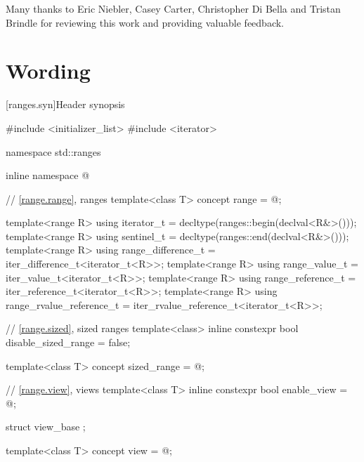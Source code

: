 \documentclass{wg21}
\begin{document}
Many thanks to Eric Niebler, Casey Carter, Christopher Di Bella and Tristan Brindle for
reviewing this work and providing valuable feedback.

\section{Wording}


[ranges.syn]{Header  synopsis}

%
\begin{codeblock}
#include <initializer_list>
#include <iterator>

namespace std::ranges {
	inline namespace @

	// \ref{range.range}, ranges
	template<class T>
	concept range = @\seebelow@;

	template<range R>
	using iterator_t = decltype(ranges::begin(declval<R&>()));
	template<range R>
	using sentinel_t = decltype(ranges::end(declval<R&>()));
	template<range R>
	using range_difference_t = iter_difference_t<iterator_t<R>>;
	template<range R>
	using range_value_t = iter_value_t<iterator_t<R>>;
	template<range R>
	using range_reference_t = iter_reference_t<iterator_t<R>>;
	template<range R>
	using range_rvalue_reference_t = iter_rvalue_reference_t<iterator_t<R>>;

	// \ref{range.sized}, sized ranges
	template<class>
	inline constexpr bool disable_sized_range = false;

	template<class T>
	concept sized_range = @\seebelow@;

	// \ref{range.view}, views
	template<class T>
	inline constexpr bool enable_view = @\seebelow@;

	struct view_base { };

	template<class T>
	concept view = @\seebelow@;

}
\end{codeblock}
\end{document}
